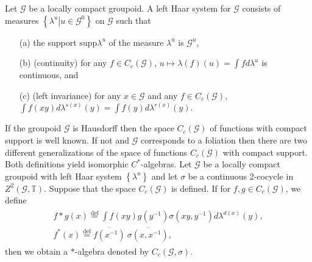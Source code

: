 \documentclass{beamer}
\theoremstyle{plain}
\newcommand{\G}{\mathcal{G}}
\newcommand{\supp}{\mathrm{supp}}
\newcommand{\T}{\mathbb{T}}
\newcommand{\la}{\lambda}
\newcommand{\bean}{\begin{eqnarray*}}
\newcommand{\eean}{\end{eqnarray*}}
\newcommand{\bydef}{\stackrel{\mathrm{def}}{=}}
\begin{document}
\begin{frame}

\begin{definition}
Let $\G$ be a locally compact  groupoid. A \alert{left  Haar system} for $\G$
consists of measures $\left\{\left.\la^u \right| u \in \G^0\right\}$ on $\G$ such that
\begin{enumerate}
	\item [(a)] the support $\supp\la^u$ of the measure $\la^u$ is $\G^u$,
	\item [(b)]  (continuity) for any $f \in C_c\left(\G\right)$, $u \mapsto \la(f)(u) = \int f d\la^u$ is continuous, and
	\item [(c)]  (left invariance) for any $x\in \G$ and any $f \in  C_c(\G )$, $\int  f ( x y ) d\la^{s(x)}(y) =
	\int f(y)d\la^{r(x)}(y)$.
	
\end{enumerate}
\end{definition}
\end{frame}
\begin{frame}
		If the groupoid $\G$ is Hausdorff then the space $C_c\left( \G\right)$ of functions with compact support is well known. If not and $\G$ corresponds to a foliation then  there are two  different generalizations of  the space of functions  $C_c\left( \G\right)$  with compact support. Both definitions yield isomorphic $C^*$-algebras.
	Let $\G$ be a locally compact groupoid with left  Haar system $\left\{\la^u\right\}$ and let $\sigma$ be a continuous 2-cocycle in $Z^2\left(\G, \T\right)$. Suppose that the space $C_c\left( \G\right)$ is defined.
If for $f ,g \in C_c(\G)$, we define
\bean
\begin{split}
	f * g \left(x\right)\bydef 
	\int f ( x y ) g \left( y^{-1}\right)\sigma\left(xy, y^{-1} \right) d\la^{d(x)}(y),\\
	f^* ( x ) \bydef \overline{f ( x^{ -1})}~\overline{\sigma\left(x, x^{-1} \right)}, 	
\end{split}
\eean
then we obtain a $*$-algebra denoted by $C_c(\G, \sigma)$.


\end{frame}
\end{document}
